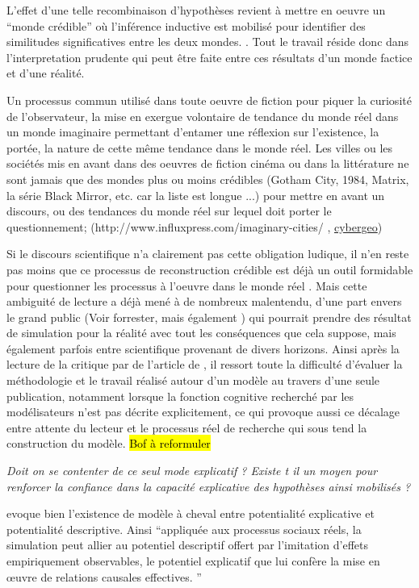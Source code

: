 L'effet d'une telle recombinaison d'hypothèses revient à mettre en oeuvre un \enquote{monde crédible} où l'inférence inductive est mobilisé pour identifier des similitudes significatives entre les deux mondes. \autocites{Livet2006, Phan2008}. Tout le travail réside donc dans l'interpretation prudente qui peut être faite entre ces résultats d'un monde factice et d'une réalité.

Un processus commun utilisé dans toute oeuvre de fiction pour piquer la curiosité de l'observateur, la mise en exergue volontaire de tendance du monde réel dans un monde imaginaire permettant d'entamer une réflexion sur l'existence, la portée, la nature de cette même tendance dans le monde réel. Les villes ou les sociétés mis en avant dans des oeuvres de fiction cinéma ou dans la littérature ne sont jamais que des mondes plus ou moins crédibles (Gotham City, 1984, Matrix, la série Black Mirror, etc. car la liste est longue ...)  pour mettre en avant un discours, ou des tendances du monde réel sur lequel doit porter le questionnement; (http://www.influxpress.com/imaginary-cities/ , \href{http://cybergeo.revues.org/1170#tocto1n9?}{cybergeo})

Si le discours scientifique n'a clairement pas cette obligation ludique, il n'en reste pas moins que ce processus de reconstruction crédible est déjà un outil formidable pour questionner les processus à l'oeuvre dans le monde réel . Mais cette ambiguité de lecture a déjà mené à de nombreux malentendu, d'une part envers le grand public (Voir forrester, mais également ) qui pourrait prendre des résultat de simulation pour la réalité avec tout les conséquences que cela suppose, mais également parfois entre scientifique provenant de divers horizons. Ainsi après la lecture de la critique par \textcite{Chattoe2011} de l'article de \textcite{Yanoff2009}, il ressort toute la difficulté d'évaluer la méthodologie et le travail réalisé autour d'un modèle au travers d'une seule publication, notamment lorsque la fonction cognitive recherché par les modélisateurs n'est pas décrite explicitement, ce qui provoque aussi ce décalage entre attente du lecteur et le processus réel de recherche qui sous tend la construction du modèle. \hl{Bof à reformuler}

\textit{Doit on se contenter de ce seul mode explicatif ? Existe t il un moyen pour renforcer la confiance dans la capacité explicative des hypothèses ainsi mobilisés ? } 

\textcite{Bulle2005} evoque bien l'existence de modèle à cheval entre potentialité explicative et potentialité descriptive. Ainsi \enquote{appliquée aux processus sociaux réels, la simulation peut allier au potentiel descriptif offert par l’imitation d’effets empiriquement observables, le potentiel explicatif que lui confère la mise en œuvre de relations causales effectives. }

